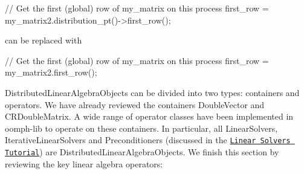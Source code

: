 \begin{DoxyCodeInclude}
  
  \textcolor{comment}{// Get the first (global) row of my\_matrix on this process}
  first\_row =  my\_matrix2.distribution\_pt()->first\_row();

\end{DoxyCodeInclude}


can be replaced with


\begin{DoxyCodeInclude}
  
  \textcolor{comment}{// Get the first (global) row of my\_matrix on this process}
  first\_row =  my\_matrix2.first\_row();

\end{DoxyCodeInclude}


{\ttfamily Distributed\+Linear\+Algebra\+Objects} can be divided into two types\+: containers and operators. We have already reviewed the containers {\ttfamily Double\+Vector} and {\ttfamily C\+R\+Double\+Matrix}. A wide range of operator classes have been implemented in {\ttfamily oomph-\/lib} to operate on these containers. In particular, all {\ttfamily Linear\+Solvers}, {\ttfamily Iterative\+Linear\+Solvers} and {\ttfamily Preconditioners} (discussed in the \href{../../../linear_solvers/html/index.html}{\tt Linear Solvers Tutorial}) are {\ttfamily Distributed\+Linear\+Algebra\+Objects}. We finish this section by reviewing the key linear algebra operators\+:



